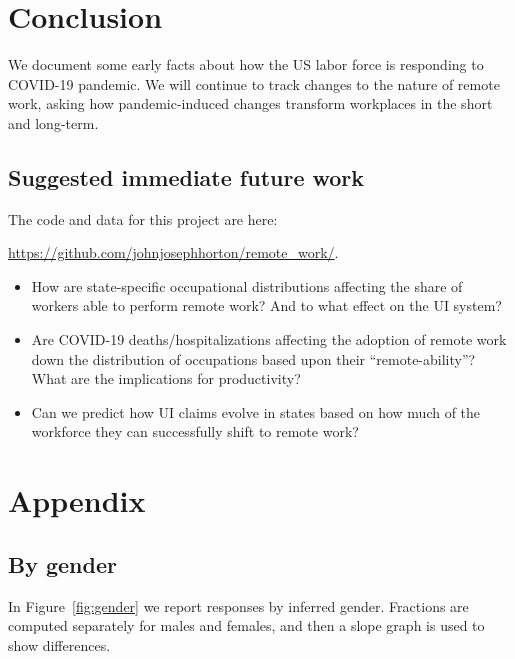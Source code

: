 \documentclass[12pt]{article}
\begin{document}
\section{Conclusion}
We document some early facts about how the US labor force is responding to COVID-19 pandemic.
We will continue to track changes to the nature of remote work, asking how pandemic-induced changes transform workplaces in the short and long-term.

\subsection{Suggested immediate future work} 

The code and data for this project are here:

\href{https://github.com/johnjosephhorton/remote\_work/}{https://github.com/johnjosephhorton/remote\_work/}.

\begin{itemize}
\item How are state-specific occupational distributions affecting the share of workers able to perform remote work? And to what effect on the UI system? 
\item Are COVID-19 deaths/hospitalizations affecting the adoption of remote work down the distribution of occupations based upon their ``remote-ability''? What are the implications for productivity?
  \item Can we predict how UI claims evolve in states based on how much of the workforce they can successfully shift to remote work? 
\end{itemize}


\newpage \clearpage




\appendix

\section{Appendix} 
\subsection{By gender} \label{sec:gender}

In Figure~\ref{fig:gender} we report responses by inferred gender.
Fractions are computed separately for males and females, and then a slope graph is used to show differences. 
\end{document}
